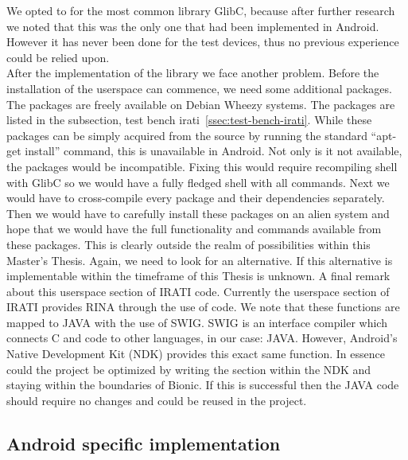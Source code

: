 We opted to for the most common library GlibC, because after further research we noted that this was the only one that had been implemented in Android. However it has never been done for the test devices, thus no previous experience could be relied upon. 
\\
After the implementation of the library we face another problem. Before the installation of the userspace can commence, we need some additional packages. The packages are freely available on Debian Wheezy systems. The packages are listed in the subsection, test bench irati~\ref{ssec:test-bench-irati}. While these packages can be simply acquired from the source by running the standard ``apt-get install'' command, this is unavailable in Android. Not only is it not available, the packages would be incompatible. 
\npar
Fixing this would require recompiling shell with GlibC so we would have a fully fledged shell with all commands. Next we would have to cross-compile every package and their dependencies separately. Then we would have to carefully install these packages on an alien system and hope that we would have the full functionality and commands available from these packages. This is clearly outside the realm of possibilities within this Master's Thesis. Again, we need to look for an alternative. If this alternative is implementable within the timeframe of this Thesis is unknown.
\npar
A final remark about this userspace section of IRATI code. Currently the userspace section of IRATI provides RINA through the use of \cpp code.  We note that these \cpp functions are mapped to JAVA with the use of SWIG. SWIG is an interface compiler which connects C and \cpp code to other languages, in our case: JAVA. However, Android's Native Development Kit (NDK) provides this exact same function. In essence could the project be optimized by writing the \cpp section within the NDK and staying within the boundaries of Bionic. If this is successful then the JAVA code should require no changes and could be reused in the project. 

\subsection{Android specific implementation}



